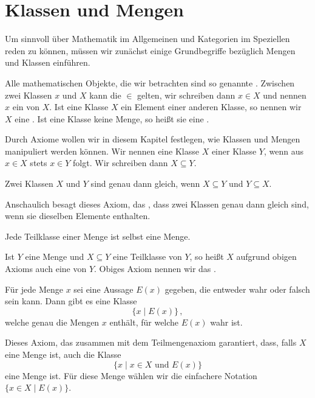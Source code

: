 \section{Klassen und Mengen}
Um sinnvoll über Mathematik im Allgemeinen und Kategorien im Speziellen reden zu können, müssen wir zunächst einige Grundbegriffe bezüglich Mengen und Klassen einführen.

Alle mathematischen Objekte, die wir betrachten sind so genannte . Zwischen zwei Klassen $x$ und $X$ kann die  $\in$ gelten, wir schreiben dann $x\in X$ und nennen $x$ ein  von $X$. Ist eine Klasse $X$ ein Element einer anderen Klasse, so nennen wir $X$ eine . Ist eine Klasse keine Menge, so heißt sie eine .

Durch Axiome wollen wir in diesem Kapitel festlegen, wie Klassen und Mengen manipuliert werden können. Wir nennen eine Klasse $X$  einer Klasse $Y$, wenn aus $x\in X$ stets $x\in Y$ folgt. Wir schreiben dann $X\subseteq Y$.

\begin{axiom}
Zwei Klassen $X$ und $Y$ sind genau dann gleich, wenn $X\subseteq Y$ und $Y\subseteq X$.
\end{axiom}

Anschaulich besagt dieses Axiom, das , dass zwei Klassen genau dann gleich sind, wenn sie dieselben Elemente enthalten.

\begin{axiom}
Jede Teilklasse einer Menge ist selbst eine Menge.
\end{axiom}

Ist $Y$ eine Menge und $X\subseteq Y$ eine Teilklasse von $Y$, so heißt $X$ aufgrund obigen Axioms auch eine  von $Y$. Obiges Axiom nennen wir das .

\begin{axiom}
Für jede Menge $x$ sei eine Aussage $E(x)$ gegeben, die entweder wahr oder falsch sein kann. Dann gibt es eine Klasse
\[
\{x\mid E(x)\}\,,
\]
welche genau die Mengen $x$ enthält, für welche $E(x)$ wahr ist.
\end{axiom}

Dieses Axiom, das  zusammen mit dem Teilmengenaxiom garantiert, dass, falls $X$ eine Menge ist, auch die Klasse
\[
\{x\mid x\in X\text{ und }E(x)\}
\]
eine Menge ist. Für diese Menge wählen wir die einfachere Notation $\{x\in X\mid E(x)\}$.

